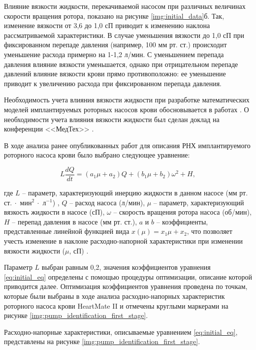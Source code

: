 Влияние вязкости жидкости, перекачиваемой насосом при различных величинах скорости вращения ротора, показано на рисунке \ref{img:initial_data}б. Так, изменение вязкости от 3,6 до 1,0 сП приводит к изменению наклона рассматриваемой характеристики. В случае уменьшения вязкости до 1,0 сП при фиксированном перепаде давления (например, 100 мм рт. ст.) происходит уменьшение расхода примерно на 1-1,2 л/мин. С уменьшением перепада давления влияние вязкости уменьшается, однако при отрицательном перепаде давлений влияние вязкости крови прямо противоположно: ее уменьшение приводит к увеличению расхода при фиксированном перепада давления. 

Необходимость учета влияния вязкости жидкости при разработке математических моделей имплантируемых роторных насосов крови обосновывается в работах \cite{Malagutti_2007, Pennings_2013, 4352467}. О необходимости учета влияния вязкости жидкости был сделан доклад на конференции <<МедТех>> \cite{medtech_2014}.

В ходе анализа ранее опубликованных работ \cite{Moscato_2009, Pirbodaghi_2011} для описания РНХ имплантируемого роторного насоса крови было выбрано следующее уравнение:

\begin{equation}
	\label{eq:initial_eq}
	L\frac{dQ}{dt} = (a_1\mu+a_2)Q + (b_1\mu+b_2)\omega^2 + H,
\end{equation}

\noindent где $L$ -- параметр, характеризующий инерцию жидкости в данном насосе (мм рт. ст.$~\cdot$ мин$^2~\cdot$ л$^{-1}$) \cite{Moscato_2009}, $Q$ -- расход насоса (л/мин), $\mu$ -- параметр, характеризующий вязкость жидкости в насосе (сП), $\omega$ -- скорость вращения ротора насоса (об/мин), $H$ -- перепад давления в насосе (мм рт. ст.), $a$ и $b$ -- коэффициенты, представленные линейной функцией вида $x(\mu) = x_1\mu + x_2$, что позволяет учесть изменение в наклоне расходно-напорной характеристики при изменении вязкости жидкости ($\mu$, сП) \cite{Malagutti_2007}. 

Параметр $L$ выбран равным 0,2, значения коэффициентов уравнения \eqref{eq:initial_eq} определены с помощью процедуры оптимизации, описание которой приводится далее. Оптимизация коэффициентов уравнения проведена по точкам, которые были выбраны в ходе анализа расходно-напорных характеристик роторного насоса крови HeartMate II и отмечены круглыми маркерами на рисунке \ref{img:pump_identification_first_stage}.

Расходно-напорные характеристики, описываемые уравнением \eqref{eq:initial_eq}, представлены на рисунке \ref{img:pump_identification_first_stage}. 

